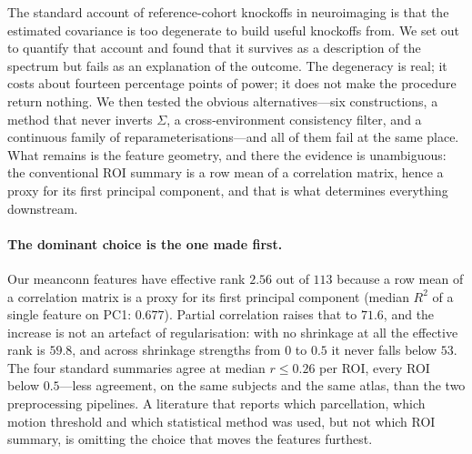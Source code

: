 \documentclass[11pt,a4paper]{article}
\begin{document}
The standard account of reference-cohort knockoffs in neuroimaging is that
the estimated covariance is too degenerate to build useful knockoffs from.
We set out to quantify that account and found that it survives as a
description of the spectrum but fails as an explanation of the outcome. The
degeneracy is real; it costs about fourteen percentage points of power; it
does not make the procedure return nothing. We then tested the obvious
alternatives---six constructions, a method that never inverts $\Sigma$, a
cross-environment consistency filter, and a continuous family of
reparameterisations---and all of them fail at the same place. What remains
is the feature geometry, and there the evidence is unambiguous: the
conventional ROI summary is a row mean of a correlation matrix, hence a
proxy for its first principal component, and that is what determines
everything downstream.

\paragraph{The dominant choice is the one made first.}
Our meanconn features have effective rank $2.56$ out of $113$ because a row
mean of a correlation matrix is a proxy for its first principal component
(median $R^2$ of a single feature on PC1: $0.677$). Partial correlation
raises that to $71.6$, and the increase is not an artefact of regularisation:
with no shrinkage at all the effective rank is $59.8$, and across shrinkage
strengths from $0$ to $0.5$ it never falls below $53$. The four standard
summaries agree at median $r\le0.26$ per ROI, every ROI below $0.5$---less
agreement, on the same subjects and the same atlas, than the two
preprocessing pipelines. A literature that reports which parcellation, which
motion threshold and which statistical method was used, but not which ROI
summary, is omitting the choice that moves the features furthest.
\end{document}

